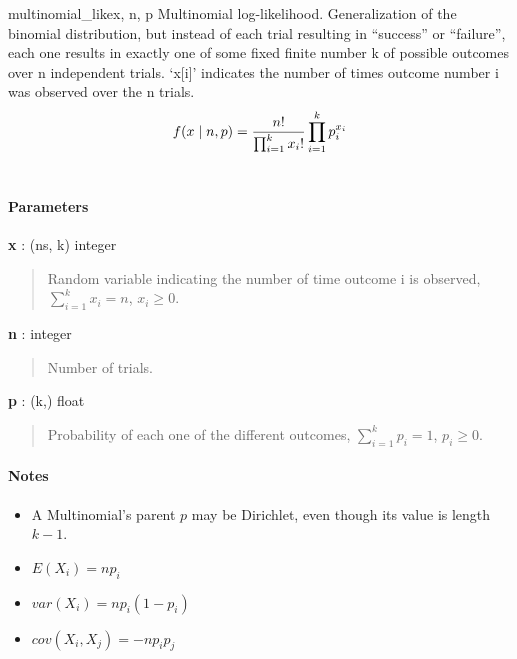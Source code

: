 \hypertarget{pymc.distributions.multinomial_like}{}
\begin{funcdesc}{multinomial\_like}{x, n, p}
Multinomial log-likelihood. Generalization of the binomial
distribution, but instead of each trial resulting in ``success'' or
``failure'', each one results in exactly one of some fixed finite number k
of possible outcomes over n independent trials. `x{[}i{]}' indicates the number
of times outcome number i was observed over the n trials.
\begin{gather}
\begin{split}f(x \mid n, p) = \frac{n!}{\prod_{i=1}^k x_i!} \prod_{i=1}^k p_i^{x_i}\end{split}\notag\\\begin{split}\end{split}\notag
\end{gather}\paragraph{Parameters}\begin{paramlist}

\item[] \textbf{x} : (ns, k) integer
\begin{quote}

Random variable indicating the number of time outcome i is observed,
$\sum_{i=1}^k x_i=n$, $x_i \ge 0$.
\end{quote}

\item[] \textbf{n} : integer
\begin{quote}

Number of trials.
\end{quote}

\item[] \textbf{p} : (k,) float
\begin{quote}

Probability of each one of the different outcomes,
$\sum_{i=1}^k p_i = 1$, $p_i \ge 0$.
\end{quote}
\end{paramlist}
\paragraph{Notes}
\begin{itemize}
\item {} A Multinomial's parent $p$ may be Dirichlet, even though its value is length $k-1$.
   
\item {} 
$E(X_i)=n p_i$

\item {} 
$var(X_i)=n p_i(1-p_i)$

\item {} 
$cov(X_i,X_j) = -n p_i p_j$

\end{itemize}
\end{funcdesc}


